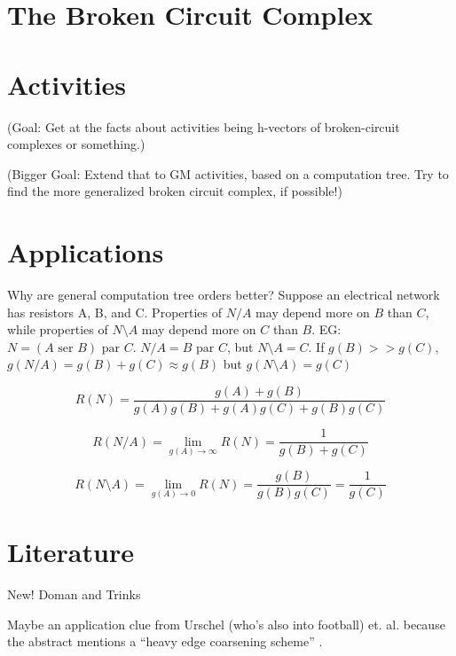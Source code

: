 \documentclass{article}
\begin{document}
\begin{enumerate}
\section{The Broken Circuit Complex}

\section{Activities}

(Goal: Get at the facts about activities being h-vectors of broken-circuit complexes or 
something.)

(Bigger Goal: Extend that to GM activities, based on a computation tree.  Try to find 
the more generalized broken circuit complex, if possible!)

\section{Applications}

Why are general computation tree orders better?  Suppose an electrical network has resistors
A, B, and C.  Properties of $N/A$ may depend more on $B$ than $C$, while properties of
$N\setminus A$ may depend more on $C$ than $B$. EG: $N=(A \text{ ser } B) \text{ par } C$.
$N/A = B \text{ par } C$, but $N\setminus A = C$.  If $g(B) >> g(C)$, 
$g(N/A) = g(B) + g(C) \approx g(B)$
but $g(N\setminus A) = g(C)$ 

\[
R(N) = \frac{g(A)+g(B)}{g(A)g(B)+g(A)g(C)+g(B)g(C)}
\]

\[
R(N/A) = \lim_{g(A)\rightarrow\infty}R(N) = \frac{1}{g(B)+g(C)}
\]

\[
R(N\setminus A) = \lim_{g(A)\rightarrow 0}R(N) = \frac{g(B)}{g(B)g(C)} = \frac{1}{g(C)}
\]







\section{Literature}

New! Doman and Trinks \cite{DohmenTrinksAbsWitBrok}

Maybe an application clue from Urschel (who's also into football) et. al.
because the abstract mentions a ``heavy edge coarsening scheme''
\cite{UrschelFiedlerGraphLaplac}.

\end{enumerate}


\end{document}
